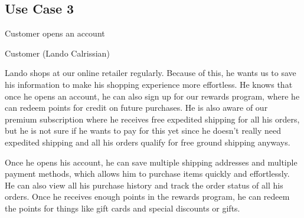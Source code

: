 \documentclass{article}
\begin{document}
\subsection{Use Case 3}
\begin{description}[font=\bfseries\itshape]
\item[Title:]Customer opens an account
\item[Actors:]Customer (Lando Calrissian)
\item[Description:]Lando shops at our online retailer regularly.  Because of this, he wants us to save his information to make his shopping experience more effortless.  He knows that once he opens an account, he can also sign up for our rewards program, where he can redeem points for credit on future purchases.  He is also aware of our premium subscription where he receives free expedited shipping for all his orders, but he is not sure if he wants to pay for this yet since he doesn't really need expedited shipping and all his orders qualify for free ground shipping anyways.

\hspace*{2em}Once he opens his account, he can save multiple shipping addresses and multiple payment methods, which allows him to purchase items quickly and effortlessly. He can also view all his purchase history and track the order status of all his orders.  Once he receives enough points in the rewards program, he can redeem the points for things like gift cards and special discounts or gifts.
\end{description}
\end{document}
